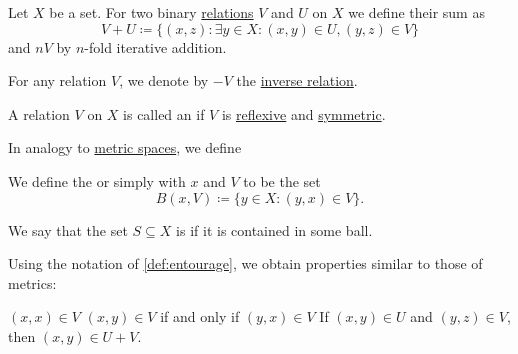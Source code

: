 \begin{definition}\label{def:entourage}
  Let \( X \) be a set. For two binary \hyperref[def:relation]{relations} \( V \) and \( U \) on \( X \) we define their sum as
  \begin{equation*}
    V + U \coloneqq \{ (x, z) \colon \exists y \in X: (x, y) \in U, (y, z) \in V \}
  \end{equation*}
  and \( nV \) by \( n \)-fold iterative addition.

  For any relation \( V \), we denote by \( -V \) the \hyperref[def:binary_relation/inverse]{inverse relation}.

  A relation \( V \) on \( X \) is called an  if \( V \) is \hyperref[def:binary_relation/reflexive]{reflexive} and \hyperref[def:binary_relation/symmetric]{symmetric}.

  In analogy to \hyperref[def:metric_space]{metric spaces}, we define
  \begin{thmenum}
     We define the  or simply  with  \( x \) and  \( V \) to be the set
    \begin{equation*}
      B(x, V) \coloneqq \{ y \in X \colon (y, x) \in V \}.
    \end{equation*}

     We say that the set \( S \subseteq X \) is  if it is contained in some ball.
  \end{thmenum}
\end{definition}

\begin{proposition}\label{thm:entourage_simulates_metric}
  Using the notation of \cref{def:entourage}, we obtain properties similar to those of metrics:
  \begin{thmenum}
     \( (x, x) \in V \)
     \( (x, y) \in V \) if and only if \( (y, x) \in V \)
     If \( (x, y) \in U \) and \( (y, z) \in V \), then \( (x, y) \in U + V \).
  \end{thmenum}
\end{proposition}

